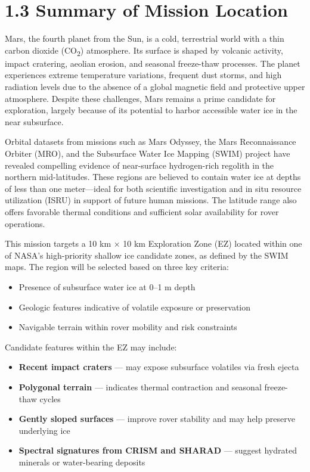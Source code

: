 
\section*{1.3 Summary of Mission Location}

Mars, the fourth planet from the Sun, is a cold, terrestrial world with a thin carbon dioxide (CO\textsubscript{2}) atmosphere. Its surface is shaped by volcanic activity, impact cratering, aeolian erosion, and seasonal freeze-thaw processes. The planet experiences extreme temperature variations, frequent dust storms, and high radiation levels due to the absence of a global magnetic field and protective upper atmosphere. Despite these challenges, Mars remains a prime candidate for exploration, largely because of its potential to harbor accessible water ice in the near subsurface.

Orbital datasets from missions such as Mars Odyssey, the Mars Reconnaissance Orbiter (MRO), and the Subsurface Water Ice Mapping (SWIM) project have revealed compelling evidence of near-surface hydrogen-rich regolith in the northern mid-latitudes. These regions are believed to contain water ice at depths of less than one meter—ideal for both scientific investigation and in situ resource utilization (ISRU) in support of future human missions. The latitude range also offers favorable thermal conditions and sufficient solar availability for rover operations.

This mission targets a 10 km × 10 km Exploration Zone (EZ) located within one of NASA’s high-priority shallow ice candidate zones, as defined by the SWIM maps. The region will be selected based on three key criteria:

\begin{itemize}
    \item Presence of subsurface water ice at 0–1 m depth
    \item Geologic features indicative of volatile exposure or preservation
    \item Navigable terrain within rover mobility and risk constraints
\end{itemize}

Candidate features within the EZ may include:

\begin{itemize}
    \item \textbf{Recent impact craters} — may expose subsurface volatiles via fresh ejecta
    \item \textbf{Polygonal terrain} — indicates thermal contraction and seasonal freeze-thaw cycles
    \item \textbf{Gently sloped surfaces} — improve rover stability and may help preserve underlying ice
    \item \textbf{Spectral signatures from CRISM and SHARAD} — suggest hydrated minerals or water-bearing deposits
\end{itemize}

